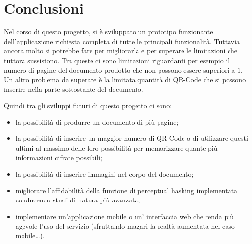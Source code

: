 \def \ti{\textit}
\def \bf{\textbf}

\chapter{Conclusioni}
	\label{cap:conclusioni}
Nel corso di questo progetto, si è sviluppato un prototipo funzionante dell'applicazione richiesta completa di tutte le principali funzionalità. Tuttavia ancora molto si potrebbe fare per migliorarla e per superare le limitazioni che tuttora sussistono. Tra queste ci sono limitazioni riguardanti per esempio il numero di pagine del documento prodotto che non possono essere superiori a $1$. Un altro problema da superare è la limitata quantità di QR-Code che si possono inserire nella parte sottostante del documento.

Quindi tra gli sviluppi futuri di questo progetto ci sono:
\begin{itemize}
	\item la possibilità di produrre un documento di più pagine;
	\item la possibilità di inserire un maggior numero di QR-Code o di utilizzare questi ultimi al massimo delle loro possibilità per memorizzare quante più informazioni cifrate possibili;
	\item la possibilità di inserire immagini nel corpo del documento;
	\item migliorare l'affidabilità della funzione di perceptual hashing implementata conducendo studi di natura più avanzata;
	\item implementare un'applicazione mobile o un' interfaccia web che renda più agevole l'uso del servizio (sfruttando magari la realtà aumentata nel caso mobile\ldots).
\end{itemize}